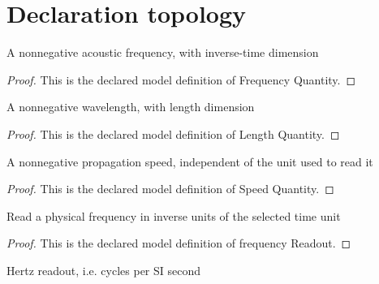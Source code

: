 \section{Declaration topology}
\begin{definition}
  \label{def:physics:phyx-mini-0190:phyxminiproblems-problemphyxmini0190-frequencyquantity}
  A nonnegative acoustic frequency, with inverse-time dimension
\end{definition}
\begin{proof}
  This is the declared model definition of Frequency Quantity.
\end{proof}
\begin{definition}
  \label{def:physics:phyx-mini-0190:phyxminiproblems-problemphyxmini0190-lengthquantity}
  A nonnegative wavelength, with length dimension
\end{definition}
\begin{proof}
  This is the declared model definition of Length Quantity.
\end{proof}
\begin{definition}
  \label{def:physics:phyx-mini-0190:phyxminiproblems-problemphyxmini0190-speedquantity}
  A nonnegative propagation speed, independent of the unit used to read it
\end{definition}
\begin{proof}
  This is the declared model definition of Speed Quantity.
\end{proof}
\begin{definition}
  \label{def:physics:phyx-mini-0190:phyxminiproblems-problemphyxmini0190-frequencyreadout}
  Read a physical frequency in inverse units of the selected time unit
\end{definition}
\begin{proof}
  This is the declared model definition of frequency Readout.
\end{proof}
\begin{definition}
  \label{def:physics:phyx-mini-0190:phyxminiproblems-problemphyxmini0190-frequencyinhertz}
  Hertz readout, i.e. cycles per SI second
\end{definition}
